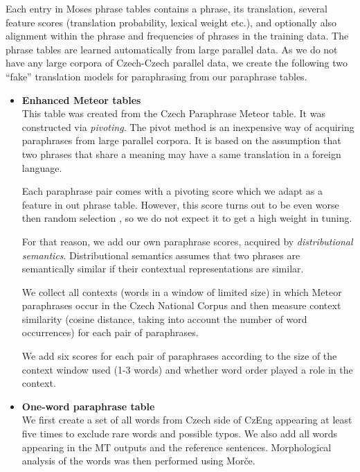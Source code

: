 Each entry in Moses phrase tables contains a phrase, its translation, several
feature scores (translation probability, lexical weight etc.), and optionally
also alignment within the phrase and frequencies of phrases in the training data.
The phrase tables are learned automatically from large parallel data.
As we do not have any large corpora of Czech-Czech parallel data, we create the 
following two ``fake'' translation models for paraphrasing from our paraphrase 
tables. 

\begin{itemize}
\item \textbf{Enhanced Meteor tables}\\
This table was created from the Czech Paraphrase Meteor table. It was constructed
via \textit{pivoting}. \cite{pivoting} The pivot method is an inexpensive way of 
acquiring paraphrases from large parallel corpora. It is based on the assumption 
that two phrases that share a meaning may have a same translation in a foreign 
language. \cite{dyvik}

Each paraphrase pair comes with a pivoting score which we adapt as a feature in 
out phrase table. However, this score turns out to be even worse then random 
selection \cite{barancikova:2014}, so we do not expect it to get a high weight 
in tuning.

For that reason, we add our own paraphrase scores, acquired by \textit{distributional
semantics}. Distributional semantics assumes that two phrases are semantically 
similar if their contextual representations are similar. \cite{miller-91}

We collect all contexts (words in a window of limited size) in which Meteor 
paraphrases occur in the Czech National Corpus \cite{SYN2010} and then measure 
context similarity (cosine distance, taking into account the number of word 
occurrences) for each pair of paraphrases. 

We add six scores for each pair of paraphrases according to the size of the 
context window used (1-3 words) and whether word order played a role in the 
context. 

\item\textbf{One-word paraphrase table}\\
We first create a set of all words from Czech side of CzEng appearing at least
five times to exclude rare words and possible typos. We also add all words appearing 
in the MT outputs and the reference sentences. Morphological analysis of the words was
then performed using Morče. 


\end{itemize}
